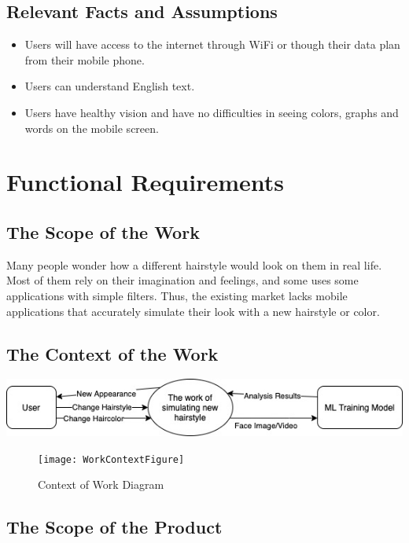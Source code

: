 \documentclass[12pt]{article}
\begin{document}
\subsection{Relevant Facts and Assumptions}
\begin{itemize}
    \item Users will have access to the internet through WiFi or though their data plan from their mobile phone.
    \item Users can understand English text.
    \item Users have healthy vision and have no difficulties in seeing colors, graphs and words on the mobile screen.
\end{itemize}

\section{Functional Requirements}
\subsection{The Scope of the Work}
Many people wonder how a different hairstyle would look on them in real life. Most of them rely on their imagination and feelings, and some uses some applications with simple filters. Thus, the existing market lacks mobile applications that accurately simulate their look with a new hairstyle or color.

\subsection{The Context of the Work}
\graphicspath{ {./context_work_diagram.jpg/} }
\includegraphics[width=\textwidth]{context_work_diagram}
\begin{figure}[h!]
\begin{center}
 \texttt{[image: WorkContextFigure]}
\caption{Context of Work Diagram}
\label{Fig_SystemContext} 
\end{center}
\end{figure}

\subsection{The Scope of the Product}
\end{document}
